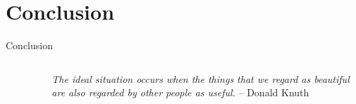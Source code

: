 \documentclass{beamer}
\begin{document}
\section{Conclusion}

    \begin{frame}{Conclusion}
		\begin{columns}
			\begin{column}{5cm}
				\begin{figure}
				\end{figure}
			\end{column}
			\begin{column}{5cm}
				\begin{flushright}
					\textit{The ideal situation occurs when
the things that we regard as beautiful
are also regarded by other
people as useful.}
					\vskip 0.5cm
				-- Donald Knuth
				\end{flushright}
			\end{column}
		\end{columns}
	\end{frame}
\end{document}
